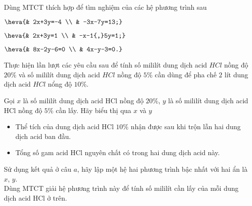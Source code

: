 \begin{vd}
	Dùng MTCT thích hợp để tìm nghiệm của các hệ phương trình sau
	\begin{listEX}[3]
	\item $\heva{& 2x+3y=-4 \\ & -3x-7y=13;}$
	\item $\heva{& 2x+3y=1 \\ & -x-1{,}5y=1;}$
	\item $\heva{& 8x-2y-6=0 \\ & 4x-y-3=0.}$
	\end{listEX}
\end{vd}
\begin{vd}
	Thực hiện lần lượt các yêu cầu sau để tính số mililít dung dịch acid $HCl$ nồng độ $20\%$ và số mililít dung dịch acid $HCl$ nồng độ $5\%$ cần dùng để pha chế $2$ lít dung dịch acid $HCl$ nổng độ $10\%$.
	\begin{listEX}[1]
	\item Gọi $x$ là số mililít dung dịch acid HCl nồng độ $20\%$, $y$ là số mililít dung dịch acid HCl nồng độ $5\%$ cần lấy. Hãy biểu thị qua $x$ và $y$
	\begin{itemize}
	\item Thể tích của dung dịch acid HCl $10 \%$ nhận được sau khi trộn lẫn hai dung dịch acid ban đầu.
	\item Tổng số gam acid HCl nguyên chất có trong hai dung dịch acid này.
	\end{itemize}
	\item Sử dụng kết quả ở câu $a$, hãy lập một hệ hai phương trình bậc nhất với hai ẩn là $x$, $y$.\\ Dùng MTCT giải hệ phương trình này để tính số mililít cần lấy của mỗi dung dịch acid HCl ở trên.
	\end{listEX}
\end{vd}
